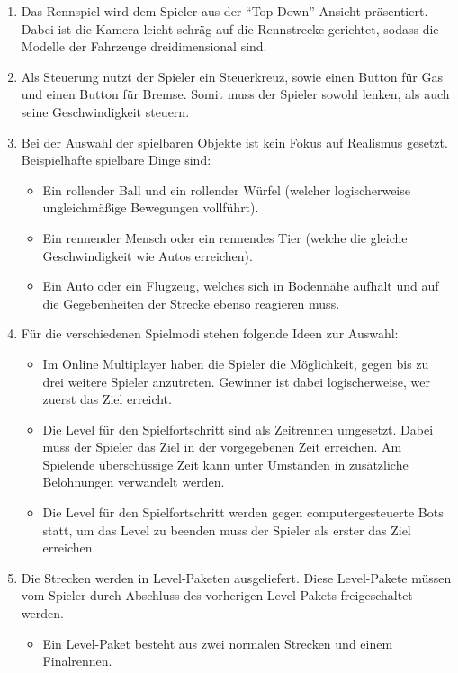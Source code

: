 	\begin{enumerate}
		\item{Das Rennspiel wird dem Spieler aus der \enquote{Top-Down}-Ansicht präsentiert. Dabei ist die Kamera leicht schräg auf die Rennstrecke gerichtet, sodass die Modelle der Fahrzeuge dreidimensional sind.}
		\item{Als Steuerung nutzt der Spieler ein Steuerkreuz, sowie einen Button für Gas und einen Button für Bremse. Somit muss der Spieler sowohl lenken, als auch seine Geschwindigkeit steuern.}
		\item{Bei der Auswahl der spielbaren Objekte ist kein Fokus auf Realismus gesetzt. Beispielhafte spielbare Dinge sind:}
		\begin{itemize}
			\item{Ein rollender Ball und ein rollender Würfel (welcher logischerweise ungleichmäßige Bewegungen vollführt).}
			\item{Ein rennender Mensch oder ein rennendes Tier (welche die gleiche Geschwindigkeit wie Autos erreichen).}
			\item{Ein Auto oder ein Flugzeug, welches sich in Bodennähe aufhält und auf die Gegebenheiten der Strecke ebenso reagieren muss.}
		\end{itemize}
		\item{Für die verschiedenen Spielmodi stehen folgende Ideen zur Auswahl:}
		\begin{itemize}
			\item{Im Online Multiplayer haben die Spieler die Möglichkeit, gegen bis zu drei weitere Spieler anzutreten. Gewinner ist dabei logischerweise, wer zuerst das Ziel erreicht.}
			\item{Die Level für den Spielfortschritt sind als Zeitrennen umgesetzt. Dabei muss der Spieler das Ziel in der vorgegebenen Zeit erreichen. Am Spielende überschüssige Zeit kann unter Umständen in zusätzliche Belohnungen verwandelt werden.}
			\item{Die Level für den Spielfortschritt werden gegen computergesteuerte Bots statt, um das Level zu beenden muss der Spieler als erster das Ziel erreichen.}
		\end{itemize}
		\item{Die Strecken werden in Level-Paketen ausgeliefert. Diese Level-Pakete müssen vom Spieler durch Abschluss des vorherigen Level-Pakets freigeschaltet werden.}
		\begin{itemize}
			\item{Ein Level-Paket besteht aus zwei normalen Strecken und einem Finalrennen.}

\end{itemize}
\end{enumerate}
